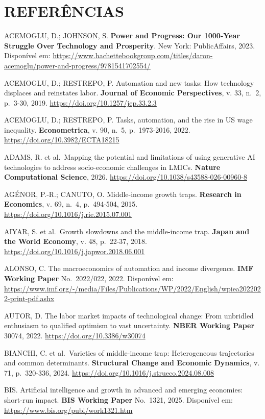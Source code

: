 \documentclass[
  brazilian,
  12pt,
]{article}
\begin{document}
\section{REFERÊNCIAS}\label{referuxeancias}

ACEMOGLU, D.; JOHNSON, S. \textbf{Power and Progress: Our 1000-Year Struggle Over Technology and Prosperity}. New York: PublicAffairs, 2023. Disponível em: \url{https://www.hachettebookgroup.com/titles/daron-acemoglu/power-and-progress/9781541702554/}

ACEMOGLU, D.; RESTREPO, P. Automation and new tasks: How technology displaces and reinstates labor. \textbf{Journal of Economic Perspectives}, v. 33, n.~2, p.~3-30, 2019. \url{https://doi.org/10.1257/jep.33.2.3}

ACEMOGLU, D.; RESTREPO, P. Tasks, automation, and the rise in US wage inequality. \textbf{Econometrica}, v. 90, n.~5, p.~1973-2016, 2022. \url{https://doi.org/10.3982/ECTA18215}

ADAMS, R. et al.~Mapping the potential and limitations of using generative AI technologies to address socio-economic challenges in LMICs. \textbf{Nature Computational Science}, 2026. \url{https://doi.org/10.1038/s43588-026-00960-8}

AGÉNOR, P.-R.; CANUTO, O. Middle-income growth traps. \textbf{Research in Economics}, v. 69, n.~4, p.~494-504, 2015. \url{https://doi.org/10.1016/j.rie.2015.07.001}

AIYAR, S. et al.~Growth slowdowns and the middle-income trap. \textbf{Japan and the World Economy}, v. 48, p.~22-37, 2018. \url{https://doi.org/10.1016/j.japwor.2018.06.001}

ALONSO, C. The macroeconomics of automation and income divergence. \textbf{IMF Working Paper} No.~2022/022, 2022. Disponível em: \url{https://www.imf.org/-/media/Files/Publications/WP/2022/English/wpiea2022022-print-pdf.ashx}

AUTOR, D. The labor market impacts of technological change: From unbridled enthusiasm to qualified optimism to vast uncertainty. \textbf{NBER Working Paper} 30074, 2022. \url{https://doi.org/10.3386/w30074}

BIANCHI, C. et al.~Varieties of middle-income trap: Heterogeneous trajectories and common determinants. \textbf{Structural Change and Economic Dynamics}, v. 71, p.~320-336, 2024. \url{https://doi.org/10.1016/j.strueco.2024.08.008}

BIS. Artificial intelligence and growth in advanced and emerging economies: short-run impact. \textbf{BIS Working Paper} No.~1321, 2025. Disponível em: \url{https://www.bis.org/publ/work1321.htm}
\end{document}
